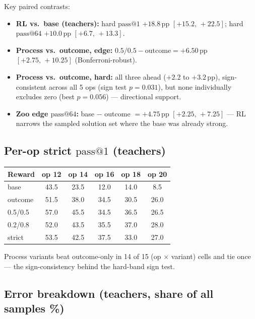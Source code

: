 \documentclass[11pt]{article}
\makeatletter
\newcommand{\passk}[1]{\ensuremath{\mathrm{pass}@#1}}
\newcommand{\pp}{\,\mathrm{pp}}
\newcommand{\ci}[2]{\ensuremath{[#1,\,#2]}}
\makeatother
\begin{document}
\noindent Key paired contrasts:
\begin{itemize}[leftmargin=1.4em,itemsep=1pt]
\item \textbf{RL vs.\ base (teachers):} hard \passk{1} $+18.8\pp$ \ci{+15.2}{+22.5};
hard \passk{64} $+10.0\pp$ \ci{+6.7}{+13.3}.
\item \textbf{Process vs.\ outcome, edge:} $0.5/0.5 - \text{outcome} = +6.50\pp$
\ci{+2.75}{+10.25} (Bonferroni-robust).
\item \textbf{Process vs.\ outcome, hard:} all three ahead ($+2.2$ to $+3.2\pp$),
sign-consistent across all 5 ops (sign test $p=0.031$), but none individually excludes
zero (best $p=0.056$) --- directional support.
\item \textbf{Zoo edge \passk{64}:} base $-$ outcome $= +4.75\pp$ \ci{+2.25}{+7.25} ---
RL narrows the sampled solution set where the base was already strong.
\end{itemize}

\subsection{Per-op strict \texorpdfstring{\passk{1}}{pass@1} (teachers)}

\begin{table}[h]\centering\small
\begin{tabular}{lccccc}
\toprule
Reward & op 12 & op 14 & op 16 & op 18 & op 20 \\
\midrule
base    & 43.5 & 23.5 & 12.0 & 14.0 & 8.5 \\
outcome & 51.5 & 38.0 & 34.5 & 30.5 & 26.0 \\
0.5/0.5 & 57.0 & 45.5 & 34.5 & 36.5 & 26.5 \\
0.2/0.8 & 52.0 & 43.5 & 35.5 & 37.0 & 28.0 \\
strict  & 53.5 & 42.5 & 37.5 & 33.0 & 27.0 \\
\bottomrule
\end{tabular}
\end{table}

\noindent Process variants beat outcome-only in 14 of 15 (op $\times$ variant) cells
and tie once --- the sign-consistency behind the hard-band sign test.

\subsection{Error breakdown (teachers, share of all samples \%)}
\end{document}
